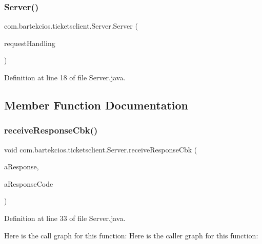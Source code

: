 \subsubsection{\texorpdfstring{Server()}{Server()}}
{\footnotesize\ttfamily com.\+bartekcios.\+ticketsclient.\+Server.\+Server (\begin{DoxyParamCaption}\item[{\hyperlink{interfacecom_1_1bartekcios_1_1ticketsclient_1_1_activity_with_request_handling}{Activity\+With\+Request\+Handling}}]{request\+Handling }\end{DoxyParamCaption})}



Definition at line 18 of file Server.\+java.



\subsection{Member Function Documentation}
\mbox{\label{classcom_1_1bartekcios_1_1ticketsclient_1_1_server_a937c61458ccddb090c991f93d38857bb}} 
\subsubsection{\texorpdfstring{receive\+Response\+Cbk()}{receiveResponseCbk()}}
{\footnotesize\ttfamily void com.\+bartekcios.\+ticketsclient.\+Server.\+receive\+Response\+Cbk (\begin{DoxyParamCaption}\item[{J\+S\+O\+N\+Array}]{a\+Response,  }\item[{int}]{a\+Response\+Code }\end{DoxyParamCaption})}



Definition at line 33 of file Server.\+java.

Here is the call graph for this function\+:
Here is the caller graph for this function\+:
\mbox{\label{classcom_1_1bartekcios_1_1ticketsclient_1_1_server_ae467fe2cd2ad1ccf4e8e61ff9ba5ca42}} 
